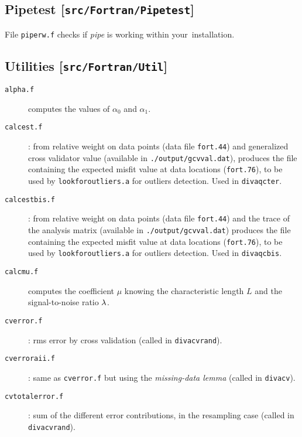 \subsection[Pipetest]{Pipetest [\texttt{src/Fortran/Pipetest}]}

File \texttt{piperw.f} checks if \textit{pipe} is working within your \diva\,installation.

\subsection[Utilities]{Utilities [\texttt{src/Fortran/Util}]}

\begin{description}
\item[\texttt{alpha.f}] computes the values of $\alpha_{0}$ and $\alpha_1$.

\item[\texttt{calcest.f}]: from relative weight on data points (data file \texttt{fort.44}) and generalized cross validator value (available in \texttt{./output/gcvval.dat}), produces the file containing the expected misfit value at data locations (\texttt{fort.76}), to be used by \texttt{look\-for\-outliers.a} for outliers detection. Used in \texttt{divaqcter}.

\item[\texttt{calcestbis.f}]: from relative weight on data points (data file \texttt{fort.44}) and the trace 
of the analysis matrix (available in \texttt{./\-output/\-gcvval.dat}) produces the file
containing the expected misfit value at data locations (\texttt{fort.76}), to be 
used by \texttt{look\-for\-outliers.a} for outliers detection. Used in \texttt{divaqcbis}.

\item[\texttt{calcmu.f}] computes the coefficient $\mu$ knowing  the characteristic length $L$ and the signal-to-noise ratio $\lambda$.

\item[\texttt{cverror.f}]: rms error by cross validation (called in \texttt{divacvrand}).

\item[\texttt{cverroraii.f}]: same as \texttt{cverror.f} but using the \textit{missing-data lemma} (called in \texttt{divacv}).

\item[\texttt{cvtotalerror.f}]: sum of the different error contributions, in the resampling case (called in \texttt{divacvrand}).



\end{description}
